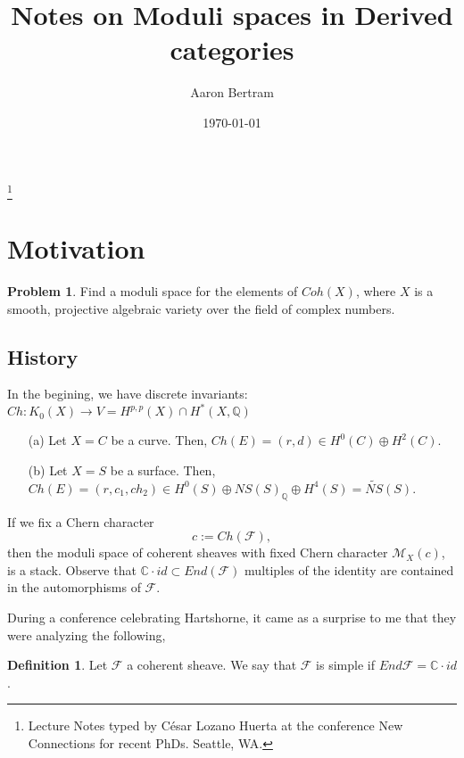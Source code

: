 \documentclass[reqno]{amsart}
\theoremstyle{plain}
\theoremstyle{definition}
\newtheorem{definition}[theorem]{Definition}
\newtheorem{problem}[theorem]{Problem}
\theoremstyle{remark}
\begin{document}
\title{Notes on Moduli spaces in Derived categories} 

\author[Bertram]{Aaron Bertram}\footnote{Lecture Notes typed by C\'esar Lozano Huerta at the conference New Connections for recent PhDs. Seattle, WA.}
\address{Department of Mathematics \\
  University of Utah \\ Salt Lake City, Utah}
\date{\today}



\maketitle


\section*{Motivation} 


\begin{problem}
Find a moduli space for the elements of $Coh(X)$, where $X$ is a smooth, projective algebraic variety over the field of complex numbers.
\end{problem}


\subsection*{History} 

In the begining, we have discrete invariants: $Ch:K_0(X)\rightarrow V=H^{p,p}(X)\cap H^*(X,\mathbb{Q})$

\begin{itemize}
\item[(a)] Let $X=C$ be a curve. Then, $Ch(E)=(r,d)\in H^0(C)\oplus H^2(C)$.

\item[(b)] Let $X=S$ be a surface. Then, $Ch(E)=(r,c_1,ch_2)\in H^0(S)\oplus NS(S)_{\mathbb{Q}}\oplus H^4(S)=\tilde {NS}(S)$.
\end{itemize}

If we fix a Chern character $$c:=Ch(\mathcal{F}),$$ then the moduli space of coherent sheaves with fixed Chern character $\mathcal{M}_X(c)$, is a stack.
Observe that $\mathbb{C}\cdot id\subset End(\mathcal{F})$ multiples of the identity are contained in the automorphisms of $\mathcal{F}$. 

During a conference celebrating Hartshorne, it came as a surprise to me that they were analyzing the following,
\begin{definition}
Let $\mathcal{F}$ a coherent sheave. We say that $\mathcal{F}$ is simple if $End{\mathcal{F}}=\mathbb{C}\cdot id$.
\end{definition}
\end{document}
